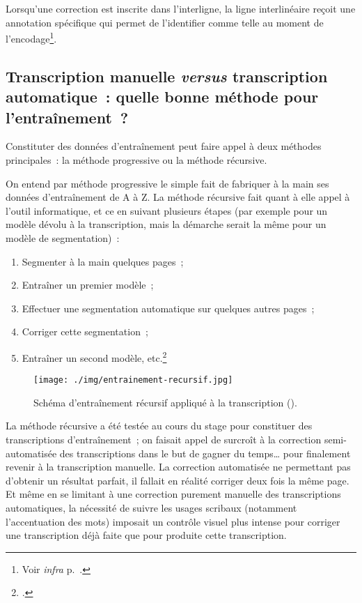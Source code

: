 \documentclass[a4paper,12pt,twoside]{book}
\begin{document}
				Lorsqu'une correction est inscrite dans l'interligne, la ligne interlinéaire reçoit une annotation spécifique qui permet de l'identifier comme telle au moment de l'encodage\footnote{Voir \textit{infra} p.~\pageref{interlinear}.}.
								
			\subsection[Transcription manuelle \textit{versus} transcription automatique]{Transcription manuelle \textit{versus} transcription automatique~: quelle bonne méthode pour l'entraînement~?}
				Constituter des données d'entraînement peut faire appel à deux méthodes principales~: la méthode progressive ou la méthode récursive.
				
				On entend par méthode progressive le simple fait de fabriquer à la main ses données d'entraînement de A à Z. La méthode récursive fait quant à elle appel à l'outil informatique, et ce en suivant plusieurs étapes (par exemple pour un modèle dévolu à la transcription, mais la démarche serait la même pour un modèle de \gls{segmentation})~:
				
				\begin{enumerate}
					\item Segmenter à la main quelques pages~;
					\item Entraîner un premier modèle~;
					\item Effectuer une \gls{segmentation} automatique sur quelques autres pages~;
					\item Corriger cette \gls{segmentation}~;
					\item Entraîner un second modèle, etc.\footcite{stokesEScriptoriumVREManuscript2021}
				\end{enumerate}
				
				\begin{figure}[!h]
					\centering
					\texttt{[image: ./img/entrainement-recursif.jpg]}
					\caption{Schéma d'entraînement récursif appliqué à la transcription (\cite{pincheHTRPresentationProblematiques2021}).}
					\label{fig}
				\end{figure}
							
				La méthode récursive a été testée au cours du stage pour constituer des transcriptions d'entraînement~; on faisait appel de surcroît à la correction semi-automatisée des transcriptions dans le but de gagner du temps… pour finalement revenir à la transcription manuelle. La correction automatisée ne permettant pas d'obtenir un résultat parfait, il fallait en réalité corriger deux fois la même page. Et même en se limitant à une correction purement manuelle des transcriptions automatiques, la nécessité de suivre les usages scribaux (notamment l'accentuation des mots) imposait un contrôle visuel plus intense pour corriger une transcription déjà faite que pour produite cette transcription.
			
\end{document}
